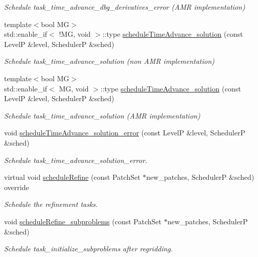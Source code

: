 \begin{DoxyCompactItemize}
\begin{DoxyCompactList}\small\item\em Schedule task\+\_\+time\+\_\+advance\+\_\+dbg\+\_\+derivatives\+\_\+error (A\+MR implementation) \end{DoxyCompactList}\item 
{\footnotesize template$<$bool MG$>$ }\\std\+::enable\+\_\+if$<$ !MG, void $>$\+::type \hyperlink{classUintah_1_1PhaseField_1_1Heat_a241faeed94f8958987941d69e1ed2d54}{schedule\+Time\+Advance\+\_\+solution} (const LevelP \&level, SchedulerP \&sched)
\begin{DoxyCompactList}\small\item\em Schedule task\+\_\+time\+\_\+advance\+\_\+solution (non A\+MR implementation) \end{DoxyCompactList}\item 
{\footnotesize template$<$bool MG$>$ }\\std\+::enable\+\_\+if$<$ MG, void $>$\+::type \hyperlink{classUintah_1_1PhaseField_1_1Heat_a241faeed94f8958987941d69e1ed2d54}{schedule\+Time\+Advance\+\_\+solution} (const LevelP \&level, SchedulerP \&sched)
\begin{DoxyCompactList}\small\item\em Schedule task\+\_\+time\+\_\+advance\+\_\+solution (A\+MR implementation) \end{DoxyCompactList}\item 
void \hyperlink{classUintah_1_1PhaseField_1_1Heat_a30a952df198959dae461297e5fd05a4e}{schedule\+Time\+Advance\+\_\+solution\+\_\+error} (const LevelP \&level, SchedulerP \&sched)
\begin{DoxyCompactList}\small\item\em Schedule task\+\_\+time\+\_\+advance\+\_\+solution\+\_\+error. \end{DoxyCompactList}\item 
virtual void \hyperlink{classUintah_1_1PhaseField_1_1Heat_af9bbe0180bc623d58e87a4bf7a5b6852}{schedule\+Refine} (const Patch\+Set $\ast$new\+\_\+patches, SchedulerP \&sched) override
\begin{DoxyCompactList}\small\item\em Schedule the refinement tasks. \end{DoxyCompactList}\item 
void \hyperlink{classUintah_1_1PhaseField_1_1Heat_ae42ceecf972057940227ee62d22fe2bf}{schedule\+Refine\+\_\+subproblems} (const Patch\+Set $\ast$new\+\_\+patches, SchedulerP \&sched)
\begin{DoxyCompactList}\small\item\em Schedule task\+\_\+initialize\+\_\+subproblems after regridding. \end{DoxyCompactList}\item 

\end{DoxyCompactItemize}

